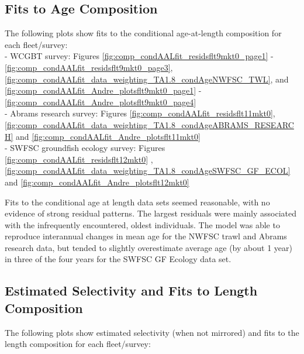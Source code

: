 \documentclass[
  english,
  a4paper,
]{article}
\begin{document}
\hypertarget{fits-to-age-composition}{%
\subsection{Fits to Age Composition}\label{fits-to-age-composition}}

The following plots show fits to the conditional age-at-length composition for each
fleet/survey:\\
- WCGBT survey: Figures \ref{fig:comp_condAALfit_residsflt9mkt0_page1} - \ref{fig:comp_condAALfit_residsflt9mkt0_page3}, \ref{fig:comp_condAALfit_data_weighting_TA1.8_condAgeNWFSC_TWL}, and \ref{fig:comp_condAALfit_Andre_plotsflt9mkt0_page1} - \ref{fig:comp_condAALfit_Andre_plotsflt9mkt0_page4}\\
- Abrams research survey: Figures \ref{fig:comp_condAALfit_residsflt11mkt0}, \ref{fig:comp_condAALfit_data_weighting_TA1.8_condAgeABRAMS_RESEARCH} and \ref{fig:comp_condAALfit_Andre_plotsflt11mkt0}\\
- SWFSC groundfish ecology survey: Figures \ref{fig:comp_condAALfit_residsflt12mkt0} , \ref{fig:comp_condAALfit_data_weighting_TA1.8_condAgeSWFSC_GF_ECOL} and \ref{fig:comp_condAALfit_Andre_plotsflt12mkt0}

Fits to the conditional age at length data sets seemed reasonable, with no evidence of strong residual patterns. The largest residuals were mainly associated with the infrequently encountered, oldest individuals. The model was able to reproduce interannual changes in mean age for the NWFSC trawl and Abrams research data, but tended to slightly overestimate average age (by about 1 year) in three of the four years for the SWFSC GF Ecology data set.

\hypertarget{estimated-selectivity-and-fits-to-length-composition}{%
\subsection{Estimated Selectivity and Fits to Length Composition}\label{estimated-selectivity-and-fits-to-length-composition}}

The following plots show estimated selectivity (when not mirrored) and fits to the length composition for each
fleet/survey:
\end{document}
